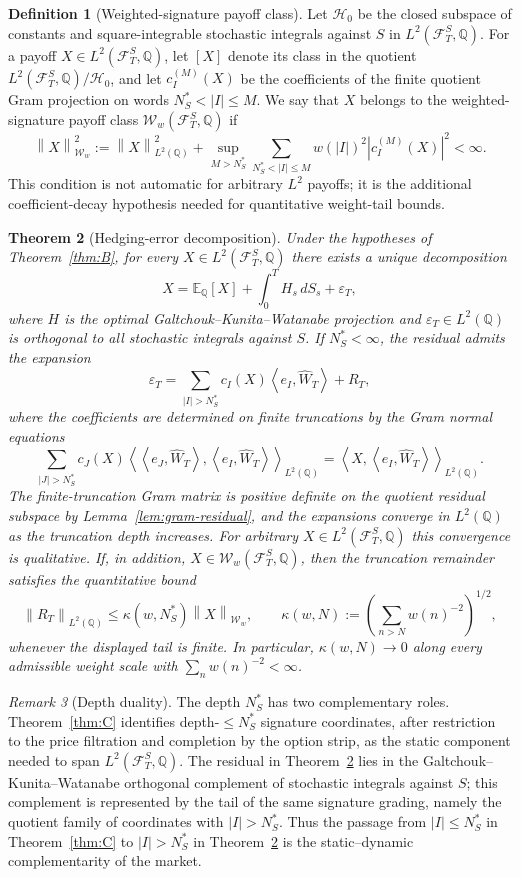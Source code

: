 \documentclass[11pt,oneside]{article}
\theoremstyle{plain}
\newtheorem{theorem}{Theorem}[section]
\theoremstyle{definition}
\newtheorem{definition}[theorem]{Definition}
\theoremstyle{remark}
\newtheorem{remark}[theorem]{Remark}
\newcommand{\E}{\mathbb{E}}
\newcommand{\Q}{\mathbb{Q}}
\newcommand{\cW}{\widehat W}
\newcommand{\FS}{\mathcal F^S}
\newcommand{\norm}[1]{\left\lVert #1\right\rVert}
\newcommand{\abs}[1]{\left\lvert #1\right\rvert}
\newcommand{\inner}[2]{\left\langle #1,#2\right\rangle}
\begin{document}
\begin{definition}[Weighted-signature payoff class]\label{def:weighted-payoff-class}
Let $\mathcal H_0$ be the closed subspace of constants and square-integrable stochastic integrals against $S$ in $L^2(\FS_T,\Q)$. For a payoff $X\in L^2(\FS_T,\Q)$, let $[X]$ denote its class in the quotient $L^2(\FS_T,\Q)/\mathcal H_0$, and let $c_I^{(M)}(X)$ be the coefficients of the finite quotient Gram projection on words $N_S^\ast<|I|\leq M$. We say that $X$ belongs to the weighted-signature payoff class $\mathcal W_w(\FS_T,\Q)$ if
\[
\norm{X}_{\mathcal W_w}^2:=\norm{X}_{L^2(\Q)}^2+\sup_{M>N_S^\ast}\sum_{N_S^\ast<|I|\leq M} w(|I|)^2\abs{c_I^{(M)}(X)}^2<\infty.
\]
This condition is not automatic for arbitrary $L^2$ payoffs; it is the additional coefficient-decay hypothesis needed for quantitative weight-tail bounds.
\end{definition}

\begin{theorem}[Hedging-error decomposition]\label{thm:D}
Under the hypotheses of Theorem~\ref{thm:B}, for every $X\in L^2(\FS_T,\Q)$ there exists a unique decomposition
\[
X=\E_\Q[X]+\int_0^T H_s\,dS_s+\varepsilon_T,
\]
where $H$ is the optimal Galtchouk--Kunita--Watanabe projection and $\varepsilon_T\in L^2(\Q)$ is orthogonal to all stochastic integrals against $S$. If $N_S^\ast<\infty$, the residual admits the expansion
\[
\varepsilon_T=\sum_{|I|>N_S^\ast}c_I(X)\inner{e_I}{\cW_T}+R_T,
\]
where the coefficients are determined on finite truncations by the Gram normal equations
\[
\sum_{|J|>N_S^\ast}c_J(X)\inner{\inner{e_J}{\cW_T}}{\inner{e_I}{\cW_T}}_{L^2(\Q)}
=\inner{X}{\inner{e_I}{\cW_T}}_{L^2(\Q)}.
\]
The finite-truncation Gram matrix is positive definite on the quotient residual subspace by Lemma~\ref{lem:gram-residual}, and the expansions converge in $L^2(\Q)$ as the truncation depth increases. For arbitrary $X\in L^2(\FS_T,\Q)$ this convergence is qualitative. If, in addition, $X\in\mathcal W_w(\FS_T,\Q)$, then the truncation remainder satisfies the quantitative bound
\[
\norm{R_T}_{L^2(\Q)}\leq \kappa(w,N_S^\ast)\norm{X}_{\mathcal W_w},
\qquad
\kappa(w,N):=\left(\sum_{n>N}w(n)^{-2}\right)^{1/2},
\]
whenever the displayed tail is finite. In particular, $\kappa(w,N)\to0$ along every admissible weight scale with $\sum_nw(n)^{-2}<\infty$.
\end{theorem}

\begin{remark}[Depth duality]
The depth $N_S^\ast$ has two complementary roles. Theorem~\ref{thm:C} identifies depth-$\leq N_S^\ast$ signature coordinates, after restriction to the price filtration and completion by the option strip, as the static component needed to span $L^2(\FS_T,\Q)$. The residual in Theorem~\ref{thm:D} lies in the Galtchouk--Kunita--Watanabe orthogonal complement of stochastic integrals against $S$; this complement is represented by the tail of the same signature grading, namely the quotient family of coordinates with $|I|>N_S^\ast$. Thus the passage from $|I|\leq N_S^\ast$ in Theorem~\ref{thm:C} to $|I|>N_S^\ast$ in Theorem~\ref{thm:D} is the static--dynamic complementarity of the market.
\end{remark}
\end{document}
